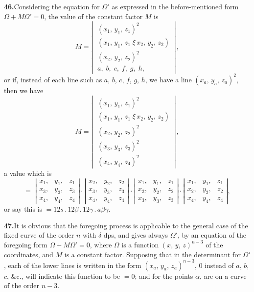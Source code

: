 \documentclass[11pt,a4paper]{article}
\theoremstyle{plain}
\theoremstyle{definition}
\theoremstyle{remark}
\begin{document}
\medskip\noindent\textbf{46.}\quad Considering the equation for $\Omega'$ as expressed in the before-mentioned form $\Omega + M\Omega' = 0$, the value of the constant factor $M$ is
\[
M = \left|\;\begin{array}{c}
(x_1,\,y_1,\,z_1)^{2}\\
(x_1,\,y_1,\,z_1\;\xi\,x_2,\,y_2,\,z_2)\\
(x_2,\,y_2,\,z_2)^{2}\\
a,\;b,\;c,\;f,\;g,\;h,
\end{array}\;\right|,
\]
or if, instead of each line such as $a$, $b$, $c$, $f$, $g$, $h$, we have a line $(x_a,\,y_a,\,z_a)^2$, then we have
\[
M = \left|\;\begin{array}{c}
(x_1,\,y_1,\,z_1)^{2}\\
(x_1,\,y_1,\,z_1\;\xi\,x_2,\,y_2,\,z_2)\\
(x_2,\,y_2,\,z_2)^{2}\\
(x_3,\,y_3,\,z_3)^{2}\\
(x_4,\,y_4,\,z_4)^{2}
\end{array}\;\right|,
\]
a value which is
\[
= \;\left|\begin{array}{ccc} x_1, & y_1, & z_1\\ x_3, & y_3, & z_3\\ x_4, & y_4, & z_4 \end{array}\right|\cdot\left|\begin{array}{ccc} x_2, & y_2, & z_2\\ x_3, & y_3, & z_3\\ x_4, & y_4, & z_4 \end{array}\right|\cdot\left|\begin{array}{ccc} x_1, & y_1, & z_1\\ x_2, & y_2, & z_2\\ x_3, & y_3, & z_3 \end{array}\right|\cdot\left|\begin{array}{ccc} x_1, & y_1, & z_1\\ x_2, & y_2, & z_2\\ x_4, & y_4, & z_4 \end{array}\right|,
\]
or say this is $= 12s\,.\,12\beta\,.\,12\gamma\,.\,a\beta\gamma$.

\medskip\noindent\textbf{47.}\quad It is obvious that the foregoing process is applicable to the general case of the fixed curve of the order $n$ with $\delta$ dps, and gives always $\Omega'$, by an equation of the foregoing form $\Omega + M\Omega' = 0$, where $\Omega$ is a function $(x,\,y,\,z)^{n-3}$ of the coordinates, and $M$ is a constant factor. Supposing that in the determinant for $\Omega'$, each of the lower lines is written in the form $(x_a,\,y_a,\,z_a)^{n-3}$, $0$ instead of $a$, $b$, $c$, \&c., will indicate this function to be $= 0$; and for the points $\alpha$, are on a curve of the order $n - 3$.
\end{document}
